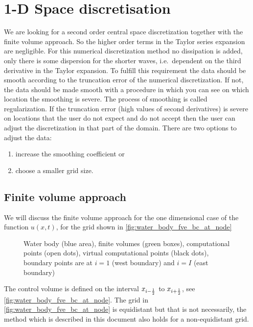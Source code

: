 \chapter{1-D Space discretisation}\label{sec:1d_space_discretisation}
We are looking for a second order central space discretization together with the finite volume approach.
So the higher order terms in the Taylor series expansion are negligible.
For this numerical discretization method no dissipation is added, only there is some dispersion for the shorter waves, i.e.\ dependent on the third derivative in the Taylor expansion.
To fulfill this requirement the data should be smooth according to the truncation error of the numerical discretization.
If not, the data should be made smooth with a procedure in which you can see on which location the smoothing is severe.
The process of smoothing is called regularization.
If the truncation error (high values of second derivatives) is severe on locations that the user do not expect and do not accept then the user can adjust the discretization in that part of the domain.
%
There are two options to adjust the data:
\begin{enumerate}
    \item increase the smoothing coefficient or
    \item choose a smaller grid size.
\end{enumerate}

\section{Finite volume approach}
We will discuss the finite volume approach for the one dimensional case of the function $u(x,t)$,
for the grid shown in  \autoref{fig:water_body_fve_bc_at_node}
\begin{figure}[H]
    \centering
    \begin{center}
    \resizebox{0.8\textwidth}{!}{
        
    }
\end{center}
    \caption{Water body (blue area), finite volumes (green boxes), computational points (open dots), virtual computational points (black dots), boundary points are at $i=1$ (west boundary) and $i=I$ (east boundary)}\label{fig:water_body_fve_bc_at_node}
\end{figure}
The control volume is defined on the interval $x_{i-\frac{1}{2}}$ to $x_{i+\frac{1}{2}}$, see \autoref{fig:water_body_fve_bc_at_node}.
The grid in \autoref{fig:water_body_fve_bc_at_node} is equidistant but that is not necessarily, the method which is described in this document also holds for a non-equidistant grid.

